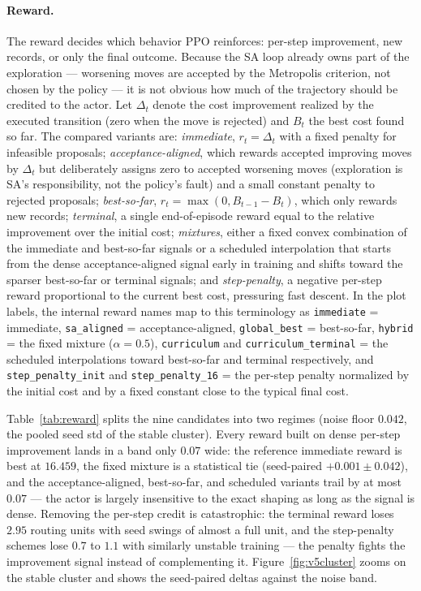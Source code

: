 \documentclass[letterpaper]{article} %
\begin{document}
\paragraph{Reward.}
The reward decides which behavior PPO reinforces: per-step improvement, new records, or only the final outcome. Because the SA loop already owns part of the exploration --- worsening moves are accepted by the Metropolis criterion, not chosen by the policy --- it is not obvious how much of the trajectory should be credited to the actor. Let $\Delta_t$ denote the cost improvement realized by the executed transition (zero when the move is rejected) and $B_t$ the best cost found so far. The compared variants are: \textit{immediate}, $r_t = \Delta_t$ with a fixed penalty for infeasible proposals; \textit{acceptance-aligned}, which rewards accepted improving moves by $\Delta_t$ but deliberately assigns zero to accepted worsening moves (exploration is SA's responsibility, not the policy's fault) and a small constant penalty to rejected proposals; \textit{best-so-far}, $r_t = \max(0, B_{t-1} - B_t)$, which only rewards new records; \textit{terminal}, a single end-of-episode reward equal to the relative improvement over the initial cost; \textit{mixtures}, either a fixed convex combination of the immediate and best-so-far signals or a scheduled interpolation that starts from the dense acceptance-aligned signal early in training and shifts toward the sparser best-so-far or terminal signals; and \textit{step-penalty}, a negative per-step reward proportional to the current best cost, pressuring fast descent. In the plot labels, the internal reward names map to this terminology as \texttt{immediate} = immediate, \texttt{sa\_aligned} = acceptance-aligned, \texttt{global\_best} = best-so-far, \texttt{hybrid} = the fixed mixture ($\alpha = 0.5$), \texttt{curriculum} and \texttt{curriculum\_terminal} = the scheduled interpolations toward best-so-far and terminal respectively, and \texttt{step\_penalty\_init} and \texttt{step\_penalty\_16} = the per-step penalty normalized by the initial cost and by a fixed constant close to the typical final cost.

Table~\ref{tab:reward} splits the nine candidates into two regimes (noise floor $0.042$, the pooled seed std of the stable cluster). Every reward built on dense per-step improvement lands in a band only $0.07$ wide: the reference immediate reward is best at $16.459$, the fixed mixture is a statistical tie (seed-paired $+0.001 \pm 0.042$), and the acceptance-aligned, best-so-far, and scheduled variants trail by at most $0.07$ --- the actor is largely insensitive to the exact shaping as long as the signal is dense. Removing the per-step credit is catastrophic: the terminal reward loses $2.95$ routing units with seed swings of almost a full unit, and the step-penalty schemes lose $0.7$ to $1.1$ with similarly unstable training --- the penalty fights the improvement signal instead of complementing it. Figure~\ref{fig:v5cluster} zooms on the stable cluster and shows the seed-paired deltas against the noise band.
\end{document}
